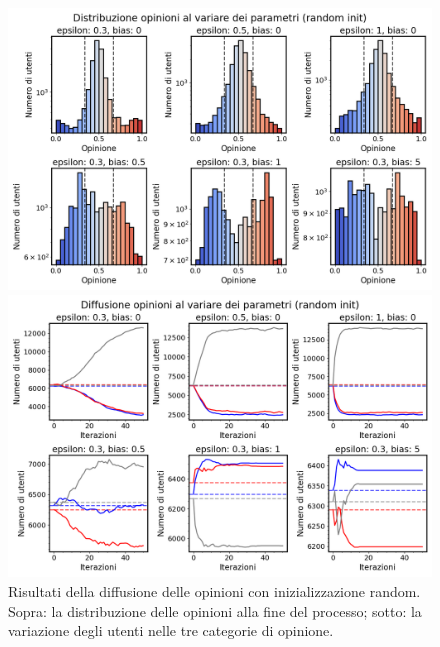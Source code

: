 \documentclass[sigchi]{acmart}
\begin{document}
\begin{figure}[h]
    \centering
    \begin{minipage}{0.48\textwidth}
        \centering
        \includegraphics[width=\linewidth]{img/Distribuzione opinioni al variare dei parametri (random init).png}
    \end{minipage}
    \hfill
    \begin{minipage}{0.48\textwidth}
        \centering
        \includegraphics[width=\linewidth]{img/Diffusione opinioni al variare dei parametri (random init).png}
    \end{minipage}
    \caption{Risultati della diffusione delle opinioni con inizializzazione random. Sopra: la distribuzione delle opinioni alla fine del processo; sotto: la variazione degli utenti nelle tre categorie di opinione. \label{fig:opinion_diffusion_random}}
\end{figure}
\end{document}
